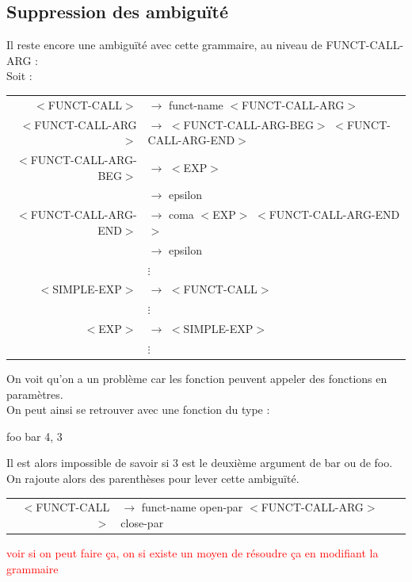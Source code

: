 \documentclass[a4paper,10pt]{article}
\begin{document}
\subsection{Suppression des ambiguïté}

	Il reste encore une ambiguïté avec cette grammaire, au niveau de FUNCT-CALL-ARG : \\
	Soit : 
		\begin{center}\begin{tabular}{rl}				
			
			$<$FUNCT-CALL$>$	& $\rightarrow$ funct-name $<$FUNCT-CALL-ARG$>$\\
			
			$<$FUNCT-CALL-ARG$>$	& $\rightarrow$ $<$FUNCT-CALL-ARG-BEG$>$ $<$FUNCT-CALL-ARG-END$>$\\ 
			$<$FUNCT-CALL-ARG-BEG$>$& $\rightarrow$ $<$EXP$>$\\ 
									& $\rightarrow$ epsilon \\
			$<$FUNCT-CALL-ARG-END$>$& $\rightarrow$ coma $<$EXP$>$ $<$FUNCT-CALL-ARG-END$>$\\ 
									& $\rightarrow$ epsilon \\
									& $\vdots$\\
									
			$<$SIMPLE-EXP$>$		& $\rightarrow$ $<$FUNCT-CALL$>$ \\
									& $\vdots$\\				
			$<$EXP$>$				& $\rightarrow$ $<$SIMPLE-EXP$>$   \\
									& $\vdots$\\
	\end{tabular}\end{center}
	On voit qu'on a un problème car les fonction peuvent appeler des fonctions en paramètres.\\
	On peut ainsi se retrouver avec une fonction du type : 
	\begin{center}
		foo bar 4, 3
	\end{center}
	Il est alors impossible de savoir si 3 est le deuxième argument de bar ou de foo.\\
	On rajoute alors des parenthèses pour lever cette ambiguïté.
		\begin{center}\begin{tabular}{rl}							
			$<$FUNCT-CALL$>$	& $\rightarrow$ funct-name open-par $<$FUNCT-CALL-ARG$>$ close-par\\
	\end{tabular}\end{center}
	\textcolor{red}{voir si on peut faire ça, on si existe un moyen de résoudre ça en modifiant la grammaire}\\
\end{document}
